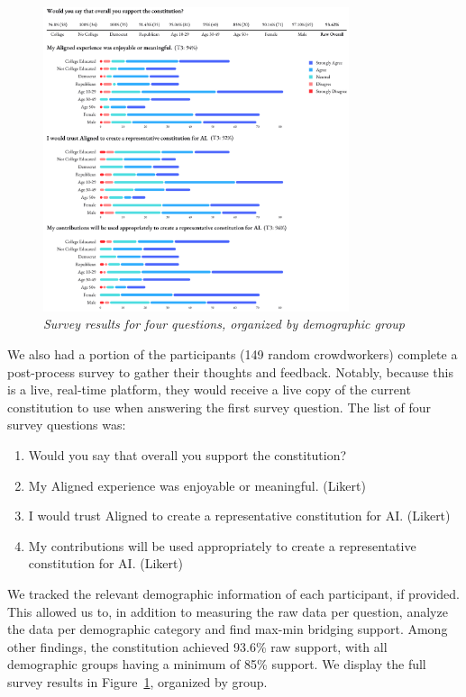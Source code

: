 \documentclass{article}
\begin{document}
\begin{multicols}{2}
\begin{figure}[ht!]
    \centering
    \includegraphics[width=0.8\textwidth]{survey.png}
    \caption{\textit{Survey results for four questions, organized by demographic group}}
    \label{survey}
\end{figure}

We also had a portion of the participants (149 random crowdworkers) complete a post-process survey to gather their thoughts and feedback. Notably, because this is a live, real-time platform, they would receive a live copy of the current constitution to use when answering the first survey question. The list of four survey questions was:
\begin{enumerate}[itemsep=0pt, topsep=0pt]
    \item Would you say that overall you support the constitution?
    \item My Aligned experience was enjoyable or meaningful. (Likert)
    \item I would trust Aligned to create a representative constitution for AI. (Likert)
    \item My contributions will be used appropriately to create a representative constitution for AI. (Likert)
\end{enumerate}

We tracked the relevant demographic information of each participant, if provided. This allowed us to, in addition to measuring the raw data per question, analyze the data per demographic category and find max-min bridging support. Among other findings, the constitution achieved 93.6\% raw support, with all demographic groups having a minimum of 85\% support. We display the full survey results in Figure~\ref{survey}, organized by group.


\end{multicols}
\end{document}
